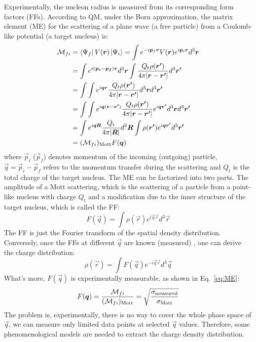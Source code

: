 Experimentally, the nucleon radius is measured from its corresponding form
factors (FFs). According to QM, under the Born approximation, the matrix element (ME) 
for the scattering of a plane wave (a free particle) from a Coulomb-like potential 
(a target nucleus) is:
\begin{equation}
    \begin{aligned}
	\CM_{fi} &= \bra{\Psi_f}V(\vec{r})\ket{\Psi_i} 
		= \int e^{-i\vec{p}_f\vec{r}}V(\vec{r}) e^{i\vec{p}_i\vec{r}} d^3\vec{r}    \\	%
	    &= \int e^{i(\vec{p_i} - \vec{p_f})\vec{r}} d^3\vec{r} 
		\int \frac{Q_t\rho(\vec{r'})}{4\pi|\vec{r} - \vec{r'}|} d^3\vec{r'} \\	%
	    &= \int \int e^{i\vec{q} \vec{r} } 
		 \frac{Q_t \rho(\vec{r'})}{4\pi|\vec{r} - \vec{r'}|} d^3\vec{r} d^3\vec{r'} \\	%
	    &= \int\int e^{i\vec{q}(\vec{r} - \vec{r'})} 
		\frac{Q_t\rho(\vec{r'})}{4\pi|\vec{r} - \vec{r'}|} e^{i\vec{q}\vec{r'}} d^3\vec{r} d^3\vec{r'}   \\  %
	    &= \int e^{i\vec{q}\vec{R}} \frac{Q_t}{4\pi|\vec{R}|} d^3\vec{R} 
		\int \rho(\vec{r'}) e^{i\vec{q} \vec{r'}}d^3 \vec{r'}	\\  %
	    &= (\CM_{fi})_{\text{Mott}} F(\vec{q})   \\	%
    \end{aligned}
    \label{eq:ME}
\end{equation}
where $\vec{p}_i$ ($\vec{p}_f$) denotes momentum of the incoming (outgoing) particle,
$\vec{q} = \vec{p}_i - \vec{p}_f$ refers to the momentum transfer during the scattering
and $Q_t$ is the total charge of the target nucleus. The ME can be factorized into two parts.
The amplitude of a Mott scattering, which is the scattering of a particle from 
a point-like nucleus with charge $Q_t$ and a modification
due to the inner structure of the target nucleus, which is called the FF:
\begin{equation}
    F(\vec{q}) = \int \rho(\vec{r}) e^{i\vec{q} \vec{r}} d^3\vec{r}
    \label{eq:ff}
\end{equation}
The FF is just the Fourier transform of the spatial density distribution.
Conversely, once the FFs at different $\vec{q}$ are known (measured) , one can
derive the charge distribution:
\begin{equation}
    \rho(\vec{r}) = \int F(\vec{q}) e^{-i\vec{q}\vec{r}} d^3\vec{q}
\end{equation}
What's more, $F(\vec{q})$ is experimentally measurable, as shown in Eq.~\ref{eq:ME}:
\begin{equation}
    F(\boldsymbol{q}) = \frac{\mathcal{M}_{fi}}{(\mathcal{M}_{fi})_{\text{Mott}}} 
	= \sqrt{\frac{\sigma_{\text{measured}}}{\sigma_{\text{Mott}}}} 
\end{equation}
The problem is, experimentally, there is no way to cover the whole phase space 
of $\vec{q}$, we can measure only limited data points at selected $\vec{q}$ values. 
Therefore, some phenomenological models are needed to extract the charge density distribution. 

